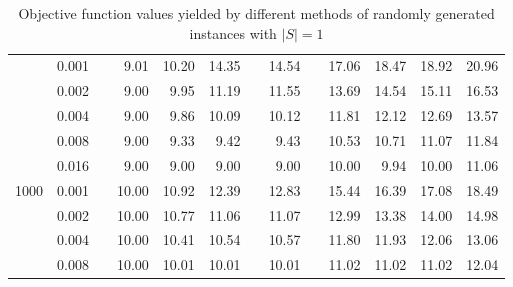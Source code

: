 \begin{table}[]
\begin{tabular}{ccrrrrrrrrrrr}
& 0.001 && 9.01 & 10.20 & 14.35 && 14.54 && 17.06 & 18.47 & 18.92 & 20.96 \\
& 0.002 && 9.00 & 9.95  & 11.19 && 11.55 && 13.69 & 14.54 & 15.11 & 16.53 \\
& 0.004 && 9.00 & 9.86  & 10.09 && 10.12 && 11.81 & 12.12 & 12.69 & 13.57 \\
& 0.008 && 9.00 & 9.33  & 9.42  && 9.43  && 10.53 & 10.71 & 11.07 & 11.84 \\
& 0.016 && 9.00 & 9.00  & 9.00  && 9.00  && 10.00 & 9.94  & 10.00 & 11.06 \\
\hline
\multirow{5}{*}{1000} 
& 0.001 && 10.00 & 10.92 & 12.39 && 12.83 && 15.44 & 16.39 & 17.08 & 18.49 \\
& 0.002 && 10.00 & 10.77 & 11.06 && 11.07 && 12.99 & 13.38 & 14.00 & 14.98 \\
& 0.004 && 10.00 & 10.41 & 10.54 && 10.57 && 11.80 & 11.93 & 12.06 & 13.06 \\
& 0.008 && 10.00 & 10.01 & 10.01 && 10.01 && 11.02 & 11.02 & 11.02 & 12.04 \\
\end{tabular}                              
\caption{Objective function values yielded by different methods of randomly generated instances with $|S|=1$}
\label{tab:obj-s1}
\end{table}

